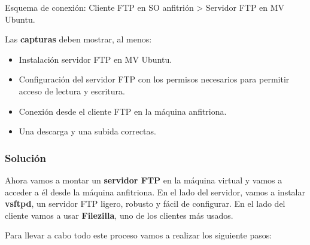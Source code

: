 Esquema de conexión: Cliente FTP en SO anfitrión > Servidor FTP en MV Ubuntu.

Las \textbf{capturas} deben mostrar, al menos:

\begin{itemize}
    \item Instalación servidor FTP en MV Ubuntu.
    \item Configuración del servidor FTP con los permisos necesarios para permitir acceso de lectura y escritura.
    \item Conexión desde el cliente FTP en la máquina anfitriona.
    \item Una descarga y una subida correctas.
\end{itemize}

\subsubsection{Solución}
Ahora vamos a montar un \textbf{servidor FTP} en la máquina virtual y vamos a acceder a él desde la máquina anfitriona. En el lado del servidor, vamos a instalar \textbf{vsftpd}, un servidor FTP ligero, robusto y fácil de configurar. En el lado del cliente vamos a usar \textbf{Filezilla}, uno de los clientes más usados.

Para llevar a cabo todo este proceso vamos a realizar los siguiente pasos:

